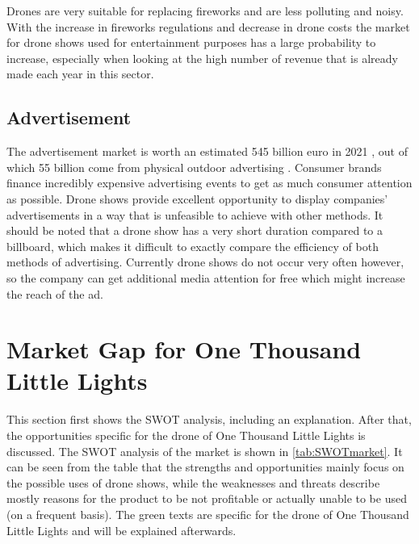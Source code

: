Drones are very suitable for replacing fireworks and are less polluting and noisy. With the increase in fireworks regulations and decrease in drone costs the market for drone shows used for entertainment purposes has a large probability to increase, especially when looking at the high number of revenue that is already made each year in this sector.  



\subsection{Advertisement}\label{subsec:advertisement}

The advertisement market is worth an estimated 545 billion euro in 2021 \cite{Ad_market_total}, out of which 55 billion come from physical outdoor advertising \cite{Ad_market_outside}. Consumer brands finance incredibly  expensive advertising events to get as much consumer attention as possible. Drone shows provide excellent opportunity to display companies' advertisements in a way that is unfeasible to achieve with other methods. It should be noted that a drone show has a very short duration compared to a billboard, which makes it difficult to exactly compare the efficiency of both methods of advertising. Currently drone shows do not occur very often however, so the company can get additional media attention for free which might increase the reach of the ad.      

\section{Market Gap for One Thousand Little Lights}\label{sec:SWOTanalysismarket}
This section first shows the SWOT analysis, including an explanation. After that, the opportunities specific for the drone of One Thousand Little Lights is discussed. The SWOT analysis of the market is shown in \autoref{tab:SWOTmarket}. It can be seen from the table that the strengths and opportunities mainly focus on the possible uses of drone shows, while the weaknesses and threats describe mostly reasons for the product to be not profitable or actually unable to be used (on a frequent basis). The green texts are specific for the drone of One Thousand Little Lights and will be explained afterwards.



